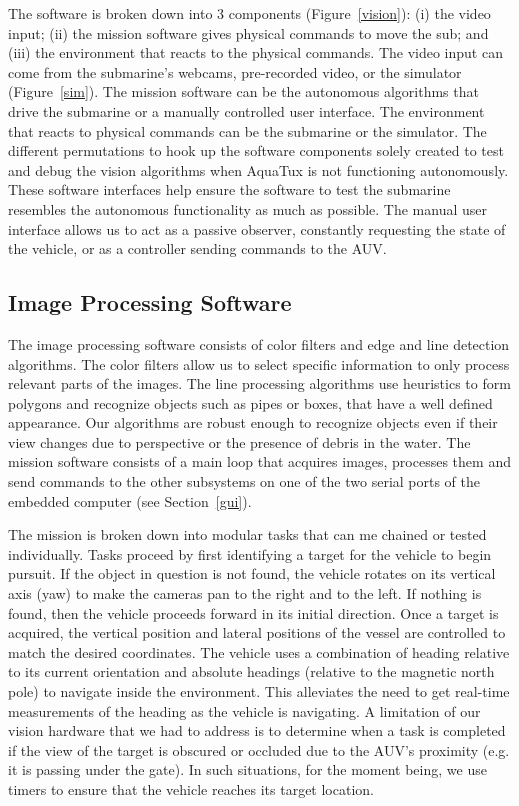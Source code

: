 The software is broken down into 3
components (Figure~\ref{vision}): (i) the video input;
(ii) the mission software gives physical commands to move the sub;
and (iii) the environment that reacts to the physical commands.
The video input can come from the submarine's webcams, pre-recorded video,
or the simulator (Figure~\ref{sim}). The mission software can be the autonomous
algorithms that drive the submarine or a manually controlled user interface.
The environment that reacts to physical commands can be the submarine or the
simulator. The different permutations to hook up the software components
solely created to test and debug the vision
algorithms when AquaTux is not functioning autonomously.
These software interfaces help ensure the software to test the submarine
resembles the autonomous functionality as much as possible.
The manual user interface allows us to act as a passive observer,
constantly requesting the state of the vehicle,
or as a controller sending commands to the AUV.


\vspace{-.1in}
\subsection{Image Processing Software}
The image processing software consists of color filters and edge and
line detection algorithms. The color filters allow us to select
specific information to only process relevant parts of the images. The
line processing algorithms use heuristics to form polygons and
recognize objects such as pipes or boxes, that have a well defined
appearance. Our algorithms are robust enough to recognize objects even
if their view changes due to perspective or the presence of debris in
the water.  The mission software consists of a main loop that acquires
images, processes them and send commands to the other subsystems on
one of the two serial ports of the embedded computer (see
Section~\ref{gui}).

The mission is broken down into modular tasks that
can me chained or tested individually. Tasks proceed by first
identifying a target for the vehicle to begin pursuit. If the object
in question is not found, the vehicle rotates on its vertical axis
(yaw) to make the cameras pan to the right and to the left. If nothing
is found, then the vehicle proceeds forward in its initial direction.
Once a target is acquired, the vertical position and lateral positions
of the vessel are controlled to match the desired coordinates.  The
vehicle uses a combination of heading relative to its current
orientation and absolute headings (relative to the magnetic north
pole) to navigate inside the environment. This alleviates the need to
get real-time measurements of the heading as the vehicle is
navigating. A limitation of our vision hardware that we had to address
is to determine when a task is completed if the view of the target is
obscured or occluded due to the AUV's proximity (e.g. it is passing
under the gate). In such situations, for the moment being, we use
timers to ensure that the vehicle reaches its target location.
